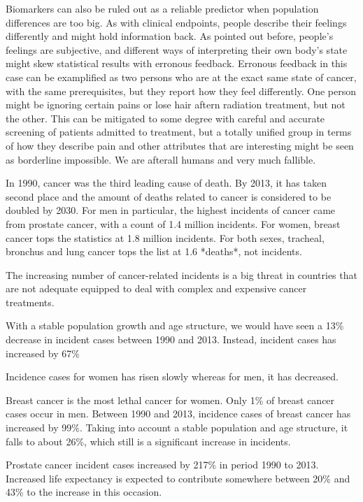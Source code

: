 \documentclass[UKenglish]{ifimaster}
\begin{document}
Biomarkers can also be ruled out as a reliable predictor when population differences are too big. As with clinical
endpoints, people describe their feelings differently and might hold information back. As pointed out before, people's
feelings are subjective, and different ways of interpreting their own body's state might skew statistical results with
erronous feedback. Erronous feedback in this case can be examplified as two persons who are at the exact same state of
cancer, with the same prerequisites, but they report how they feel differently. One person might be ignoring certain
pains or lose hair aftern radiation treatment, but not the other. This can be mitigated to some degree with careful and
accurate screening of patients admitted to treatment, but a totally unified group in terms of how they describe pain and
other attributes that are interesting might be seen as borderline impossible. We are afterall humans and very much
fallible.

In 1990, cancer was the third leading cause of death. By 2013, it has taken second place and the amount of deaths
related to cancer is considered to be doubled by 2030. For men in particular, the highest incidents of cancer came from
prostate cancer, with a count of 1.4 million incidents. For women, breast cancer tops the statistics at 1.8 million
incidents. For both sexes, tracheal, bronchus and lung cancer tops the list at 1.6 *deaths*, not incidents.

The increasing number of cancer-related incidents is a big threat in countries that are not adequate equipped to deal
with complex and expensive cancer treatments.

With a stable population growth and age structure, we would have seen a 13\% decrease in incident cases between 1990 and
2013. Instead, incident cases has increased by 67\%

Incidence cases for women has risen slowly whereas for men, it has decreased.

Breast cancer is the most lethal cancer for women. Only 1\% of breast cancer cases occur in men. Between 1990 and 2013,
incidence cases of breast cancer has increased by 99\%. Taking into account a stable population and age structure, it
falls to about 26\%, which still is a significant increase in incidents.

Prostate cancer incident cases increased by 217\% in period 1990 to 2013.  Increased life expectancy is expected to
contribute somewhere between 20\% and 43\% to the increase in this occasion.
\end{document}
